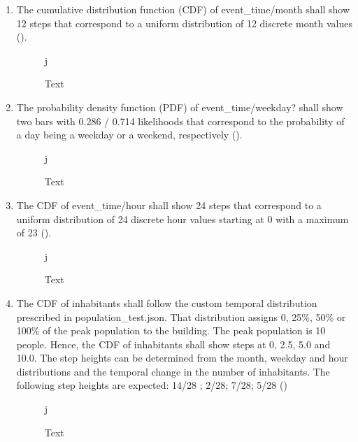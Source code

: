 \begin{enumerate}
    \item The cumulative distribution function (CDF) of event\_time/month shall show 12 steps that correspond to a uniform distribution of 12 discrete month values ().
    
\begin{figure}[!htbp]j
  \caption{Text}
  \label{fig:ver_1_1}
\end{figure}

    \item The probability density function (PDF) of event\_time/weekday? shall show two bars with 0.286 / 0.714 likelihoods that correspond to the probability of a day being a weekday or a weekend, respectively ().
    
\begin{figure}[!htbp]j
  \caption{Text}
  \label{fig:ver_1_2}
\end{figure}    
    
    \item The CDF of event\_time/hour shall show 24 steps that correspond to a uniform distribution of 24 discrete hour values starting at 0 with a maximum of 23 ().
    
\begin{figure}[!htbp]j
  \caption{Text}
  \label{fig:ver_1_3}
\end{figure}

    \item The CDF of inhabitants shall follow the custom temporal distribution prescribed in population\_test.json. That distribution assigns 0, 25\%, 50\% or 100\% of the peak population to the building. The peak population is 10 people. Hence, the CDF of inhabitants shall show steps at 0, 2.5, 5.0 and 10.0. The step heights can be determined from the month, weekday and hour distributions and the temporal change in the number of inhabitants. The following step heights are expected: 14/28 ; 2/28; 7/28; 5/28 ()

\begin{figure}[!htbp]j
  \caption{Text}
  \label{fig:ver_1_4}
\end{figure}


\end{enumerate}
